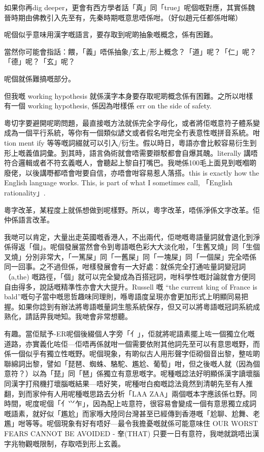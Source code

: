 \documentclass[a5paper, 10pt, openany]{book} %
\begin{document}
如果你再dig deeper，更會有西方學者話「真」同「true」呢個嘅對應，其實係魏晉時期由佛教引入先至有，先秦時期嘅意思唔係咁。（好似趙元任都係咁睇）

呢個似乎意味用漢字嘅語言，要存取到呢啲抽象嘅概念，係有困難。

當然你可能會指話：餵，「義」唔係抽象/玄上/形上概念？「道」呢？「仁」呢？「德」呢？「玄」呢？

呢個就係難搞嘅部分。

但我嘅 working hypothesis 就係漢字本身要存取呢啲概念係有困難。之所以咁樣有一個 working hypothesis, 係因為咁樣係 err on the side of safety.

粵切字要避開呢啲問題，最直接嘅方法就係完全字母化，或者將佢嘅意符子體系變成為一個平行系統，等你有一個類似諺文或者假名咁完全冇表意性嘅拼音系統。咁 tion ment ify 等等嘅詞綴就可以引入/衍生。假以時日，粵語亦會比較容易衍生到形上嘅義值詞彙。到其時，語言偽術就會唔需要辯駁都會自爆其醜。literally 講唔符合邏輯或者不符玄義嘅人，會聽起上黎自打嘴巴。我哋係100毛上面見到嘅嗰啲廢佬，以後講嘢都唔會咁要自信，亦唔會咁容易惹人落搭。this is exactly how the English language works. This, is part of what I sometimes call, 「English rationality」.

粵字改革，某程度上就係想做到呢樣野。所以，粵字改革，唔係淨係文字改革。佢仲係語言改革。




我哋可以肯定，大量出走英國嘅香港人，不出兩代，佢哋嘅粵語量詞就會退化到淨係得返「個」。呢個發展當然會令到粵語嘅色彩大大淡化啦，「生舊叉燒」同「生個叉燒」分別非常大，「一篤屎」同「一舊屎」同「一塊屎」同「一個屎」完全唔係同一回事。之不過但係，咁樣發展會有一大好處：就係完全打通咗量詞變冠詞（a,the) 嘅路徑，「個」就可以完全變成為百搭冠詞，咁科學性嘅討論就會方便同自由得多，說話嘅精準性亦會大大提升。Russell 嘅 “the current king of France is bald”嘅句子當中嘅思哲趣味同理則，喺粵語度呈現亦會更加形式上明顯同易把握。如果你諗到有辦法將粵語嘅量詞生態系統保存，但又可以將粵語嘅冠詞系統成熟化，請話畀我哋知。我哋會非常想聽。



有趣。當佢賦予-ER呢個後綴個人字旁「亻」，佢就將呢語素擺上咗一個獨立化嘅道路，亦實義化咗佢—佢唔再係就咁一個需要依附其他詞先至可以有意思嘅野，而係一個似乎有獨立性嘅野。呢個現象，有啲似古人用形聲字佢砌個音出黎，整咗啲聯綿詞出黎，譬如「琵琶、蜘蛛、駱駝、尷尬、葡萄」咁，但之後嘅人就（因為個意符？）以為「琵」同「琶」係獨立有意思嘅字。呢種嘅諗法好明顯係漢字讀壞腦同漢字打飛機打壞腦嘅結果—唔好笑，呢種咁白痴嘅諗法竟然到清朝先至有人推翻，到而家仲有人用呢種嘅思路去分析「LAA ZAA」兩個嘅本字應該係乜野。同時間，呢度呢個「亻⺍乍」，因為配上咗意符，很容易會變成一個有意思獨立成詞嘅語素，就好似「尷尬」而家喺大陸同台灣甚至已經傳到香港嘅「尬聊、尬舞、老尷」咁等等。呢個現象有好有唔好—最令我擔憂嘅就係可能意味住 OUR WORST FEARS CANNOT BE AVOIDED - 羍(THAT) 只要一日有意符，我哋就跳唔出漢字兆物觀嘅限制，存取唔到形上玄義。
\end{document}

